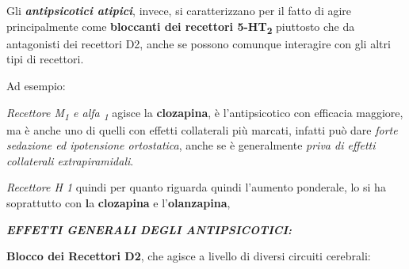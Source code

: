 \documentclass[]{article}
\begin{document}
Gli \textbf{\emph{antipsicotici atipici}}, invece, si caratterizzano per
il fatto di agire principalmente come \textbf{bloccanti dei recettori
5-HT\textsubscript{2}} piuttosto che da antagonisti dei recettori D2,
anche se possono comunque interagire con gli altri tipi di recettori.

Ad esempio:

\emph{Recettore M\textsubscript{1} e alfa \textsubscript{1}} agisce la
\textbf{clozapina}, è l'antipsicotico con efficacia maggiore, ma è anche
uno di quelli con effetti collaterali più marcati, infatti può dare
\emph{forte sedazione ed ipotensione ortostatica}, anche se è
generalmente \emph{priva di effetti collaterali extrapiramidali}.

\emph{Recettore H 1} quindi per quanto riguarda quindi l'aumento
ponderale, lo si ha soprattutto con \textbf{l}a \textbf{clozapina} e
l'\textbf{olanzapina},

\textbf{\emph{EFFETTI GENERALI DEGLI ANTIPSICOTICI:}}

\textbf{Blocco dei Recettori D2}, che agisce a livello di diversi
circuiti cerebrali:
\end{document}
